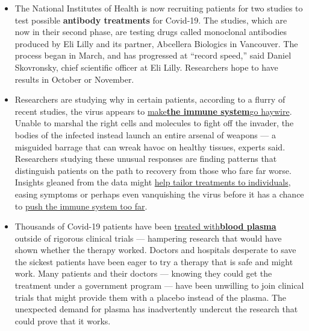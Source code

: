 \begin{itemize}
\item
  The National Institutes of Health is now recruiting patients for two
  studies to test possible \textbf{antibody treatments} for Covid-19.
  The studies, which are now in their second phase, are testing drugs
  called monoclonal antibodies produced by Eli Lilly and its partner,
  Abcellera Biologics in Vancouver. The process began in March, and has
  progressed at ``record speed,'' said Daniel Skovronsky, chief
  scientific officer at Eli Lilly. Researchers hope to have results in
  October or November.
\item
  Researchers are studying why in certain patients, according to a
  flurry of recent studies, the virus appears to
  \href{https://www.nytimes3xbfgragh.onion/2020/08/04/health/coronavirus-immune-system.html}{make}\textbf{\href{https://www.nytimes3xbfgragh.onion/2020/08/04/health/coronavirus-immune-system.html}{the
  immune
  system}}\href{https://www.nytimes3xbfgragh.onion/2020/08/04/health/coronavirus-immune-system.html}{go
  haywire}. Unable to marshal the right cells and molecules to fight off
  the invader, the bodies of the infected instead launch an entire
  arsenal of weapons --- a misguided barrage that can wreak havoc on
  healthy tissues, experts said. Researchers studying these unusual
  responses are finding patterns that distinguish patients on the path
  to recovery from those who fare far worse. Insights gleaned from the
  data might
  \href{https://www.nytimes3xbfgragh.onion/interactive/2020/science/coronavirus-drugs-treatments.html}{help
  tailor treatments to individuals}, easing symptoms or perhaps even
  vanquishing the virus before it has a chance to
  \href{https://www.nytimes3xbfgragh.onion/2020/04/01/health/coronavirus-cytokine-storm-immune-system.html}{push
  the immune system too far}.
\item
  Thousands of Covid-19 patients have been
  \href{https://www.nytimes3xbfgragh.onion/2020/08/04/health/blood-plasma-covid-19.html}{treated
  with}\textbf{\href{https://www.nytimes3xbfgragh.onion/2020/08/04/health/blood-plasma-covid-19.html}{blood
  plasma}} outside of rigorous clinical trials --- hampering research
  that would have shown whether the therapy worked. Doctors and
  hospitals desperate to save the sickest patients have been eager to
  try a therapy that is safe and might work. Many patients and their
  doctors --- knowing they could get the treatment under a government
  program --- have been unwilling to join clinical trials that might
  provide them with a placebo instead of the plasma. The unexpected
  demand for plasma has inadvertently undercut the research that could
  prove that it works.
\end{itemize}

